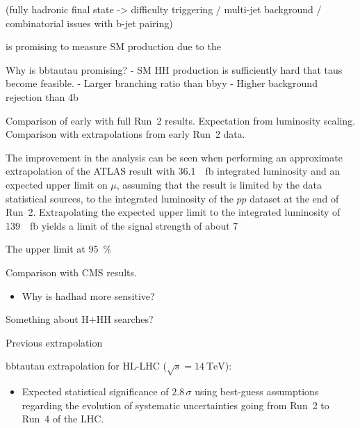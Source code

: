 (fully hadronic final state -> difficulty triggering / multi-jet
background / combinatorial issues with b-jet pairing)



is promising to measure SM \HH
production due to the

Why is bbtautau promising?
- SM HH production is sufficiently hard that taus become feasible.
- Larger branching ratio than bbyy
- Higher background rejection than 4b



Comparison of early with full Run~2 results. Expectation from
luminosity scaling. Comparison with extrapolations from early Run~2
data.

The improvement in the analysis can be seen when performing an
approximate extrapolation of the ATLAS result with
\SI{36.1}{\per\femto\barn} integrated luminosity and an expected upper
limit on $\mu$, assuming that the result is limited by the data
statistical sources, to the integrated luminosity of the $pp$ dataset
at the end of Run~2. Extrapolating the expected upper limit to the
integrated luminosity of \SI{139}{\per\femto\barn} yields a limit of
the signal strength of about 7



The upper limit at \SI{95}{\percent}



Comparison with CMS results.




\begin{itemize}
\item Why is hadhad more sensitive?
\end{itemize}


Something about H+HH searches?

Previous extrapolation~\cite{ATL-PHYS-PUB-2018-053}

bbtautau extrapolation for HL-LHC ($\sqrt{s} = \SI{14}{\TeV}$):
\cite{ATL-PHYS-PUB-2021-044}
\begin{itemize}
\item Expected statistical significance of $2.8\,\sigma$ using
  best-guess assumptions regarding the evolution of systematic
  uncertainties going from Run~2 to Run~4 of the LHC.
\end{itemize}


